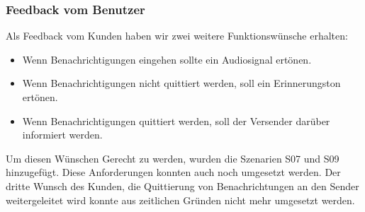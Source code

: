 \subsubsection*{Feedback vom Benutzer}

Als Feedback vom Kunden haben wir zwei weitere Funktionswünsche erhalten:

\begin{itemize}
    \item Wenn Benachrichtigungen eingehen sollte ein Audiosignal ertönen.
    \item Wenn Benachrichtigungen nicht quittiert werden, soll ein Erinnerungston ertönen.
    \item Wenn Benachrichtigungen quittiert werden, soll der Versender darüber informiert werden.
\end{itemize}

Um diesen Wünschen Gerecht zu werden, wurden die Szenarien S07 und S09 hinzugefügt.
Diese Anforderungen konnten auch noch umgesetzt werden.
Der dritte Wunsch des Kunden, die Quittierung von Benachrichtungen an den Sender weitergeleitet wird konnte aus zeitlichen Gründen nicht mehr umgesetzt werden.

\clearpage

